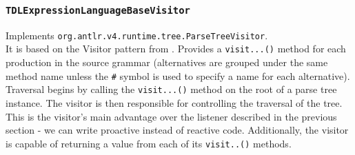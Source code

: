 \documentclass[12pt,oneside,a4paper,notitlepage]{report}
\begin{document}
	\subsubsection*{\texttt{TDLExpressionLanguageBaseVisitor}}
	\par Implements \texttt{org.antlr.v4.runtime.tree.ParseTreeVisitor}. \\ It is based on the Visitor pattern from \cite{patternbook}. Provides a \texttt{visit...()} method for each production in the source grammar (alternatives are grouped under the same method name unless the \texttt{\#} symbol is used to specify a name for each alternative). Traversal begins by calling the \texttt{visit...()} method on the root of a parse tree instance. The visitor is then responsible for controlling the traversal of the tree. This is the visitor's main advantage over the listener described in the previous section - we can write proactive instead of reactive code. Additionally, the visitor is capable of returning a value from each of its \texttt{visit..()} methods.

	\printbibliography[
		title=Sources
	]
\end{document}
